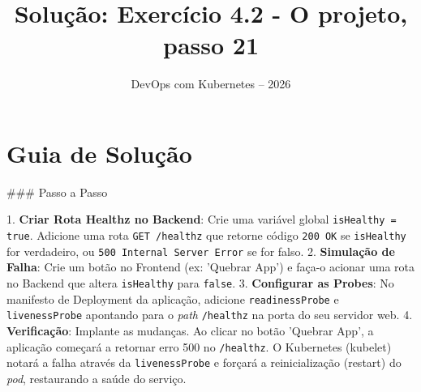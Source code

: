 \documentclass[11pt,a4paper]{article}
\title{\color{secondary}\Huge\textbf{Solução: Exercício 4.2 - O projeto, passo 21}}
\author{\color{primary}DevOps com Kubernetes -- 2026}
\date{}
\begin{document}
\maketitle

\section*{\color{primary}Guia de Solução}
\begin{tcolorbox}[colback=green!5!white,colframe=green!60!black,title=Resolução Passo a Passo]
### Passo a Passo

1. \textbf{Criar Rota Healthz no Backend}: Crie uma variável global \texttt{isHealthy = true}. Adicione uma rota \texttt{GET /healthz} que retorne código \texttt{200 OK} se \texttt{isHealthy} for verdadeiro, ou \texttt{500 Internal Server Error} se for falso.
2. \textbf{Simulação de Falha}: Crie um botão no Frontend (ex: 'Quebrar App') e faça-o acionar uma rota no Backend que altera \texttt{isHealthy} para \texttt{false}.
3. \textbf{Configurar as Probes}: No manifesto de Deployment da aplicação, adicione \texttt{readinessProbe} e \texttt{livenessProbe} apontando para o \textit{path} \texttt{/healthz} na porta do seu servidor web.
4. \textbf{Verificação}: Implante as mudanças. Ao clicar no botão 'Quebrar App', a aplicação começará a retornar erro 500 no \texttt{/healthz}. O Kubernetes (kubelet) notará a falha através da \texttt{livenessProbe} e forçará a reinicialização (restart) do \textit{pod}, restaurando a saúde do serviço.
\end{tcolorbox}
\end{document}
